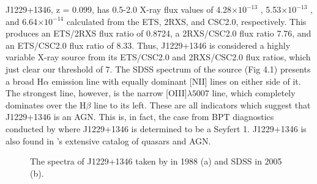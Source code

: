 J1229+1346, z = 0.099, has 0.5-2.0 X-ray flux values of 4.28$\times 10^{-13}$ \fluxunits, 5.53$\times 10^{-13}$ \fluxunits, and 6.64$\times 10^{-14}$ \fluxunits calculated from the ETS, 2RXS, and CSC2.0, respectively. 
This produces an ETS/2RXS flux ratio of 0.8724, a 2RXS/CSC2.0 flux ratio 7.76, and an ETS/CSC2.0 flux ratio of 8.33. 
Thus, J1229+1346 is considered a highly variable X-ray source from its ETS/CSC2.0 and 2RXS/CSC2.0 flux ratios, which just clear our threshold of 7. 
The SDSS spectrum of the source (Fig 4.1) presents a broad H$\alpha$ emission line with equally dominant [NII] lines on either side of it. 
The strongest line, however, is the narrow [OIII]$\lambda 5007$ line, which completely dominates over the H$\beta$ line to its left. 
These are all indicators which suggest that J1229+1346 is an AGN. 
This is, in fact, the case from BPT diagnostics conducted by \cite{puchnarewicz1992} where J1229+1346 is determined to be a Seyfert 1. 
J1229+1346 is also found in \cite{veron2006}’s extensive catalog of quasars and AGN.

\begin{figure}[t]
    \centering
    \qquad
    \caption{The spectra of J1229+1346 taken by \cite{puchnarewicz1992} in 1988 (a) and SDSS in 2005 (b). }%
    \label{fig:example}%
\end{figure}


